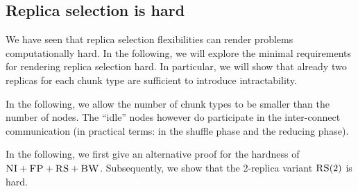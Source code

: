 \documentclass[9pt]{sigcomm-alternate}
\newcommand{\maciek}[1]{\textcolor{brown}{maciek: #1}}
\newcommand{\CC}{\textsc{NI}}
\newcommand{\FP}{\textsc{FP}}
\newcommand{\RS}{\textsc{RS}}
\newcommand{\BW}{\textsc{BW}}
\newcommand{\MA}{\textsc{MA}}
\begin{document}
\begin{appendix}


\section{Replica selection is hard}\label{ap:tworep}

We have seen that replica selection flexibilities can render problems computationally hard.
In the following, we will explore the minimal requirements for rendering replica selection hard.
In particular, we will show that already two replicas for each chunk type are sufficient to
introduce intractability.

In the following, we allow the number of chunk types to be smaller than the number of nodes.
 The ``idle'' nodes however do participate in the inter-connect communication (in practical terms: in the shuffle phase
 and the reducing phase).



In the following, we first give an alternative proof for the hardness of $\CC+\FP+\RS+\BW$.
Subsequently, we show that the 2-replica variant $\RS(2)$ is hard.



\end{appendix}
\end{document}
